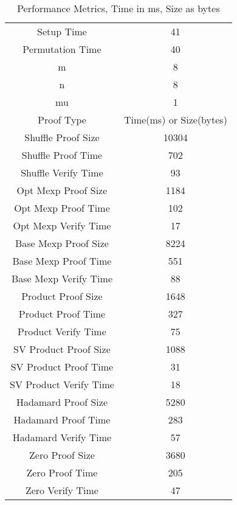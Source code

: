 \documentclass[12pt,a4paper]{report}
\begin{document}
\begin{table}
	\begin{center}
	\begin{tabular}{||c|c||}
		\hline
		Setup Time&41\\
		Permutation Time&40\\
		\hline
		m&8\\
		n&8\\
		mu&1\\
		\hline \hline
		Proof Type&Time(ms) or Size(bytes)\\
		\hline
		Shuffle Proof Size&10304\\
		Shuffle Proof Time&702\\
		Shuffle Verify Time&93\\
		\hline
		Opt Mexp Proof Size&1184\\
		Opt Mexp Proof Time&102\\
		Opt Mexp Verify Time&17\\

		Base Mexp Proof Size&8224\\
		Base Mexp Proof Time&551\\
		Base Mexp Verify Time&88\\
		\hline
		Product Proof Size&1648\\
		Product Proof Time&327\\
		Product Verify Time&75\\
		\hline
		SV Product Proof Size&1088\\
		SV Product Proof Time&31\\
		SV Product Verify Time&18\\
		\hline
		Hadamard Proof Size&5280\\
		Hadamard Proof Time&283\\
		Hadamard Verify Time&57\\
		\hline
		Zero Proof Size&3680\\
		Zero Proof Time&205\\
		Zero Verify Time&47\\
		\hline 
	\end{tabular}
	\end{center}
	\caption{Performance Metrics, Time in ms, Size as bytes}
	\label{table:allresults}
\end{table}
\end{document}

